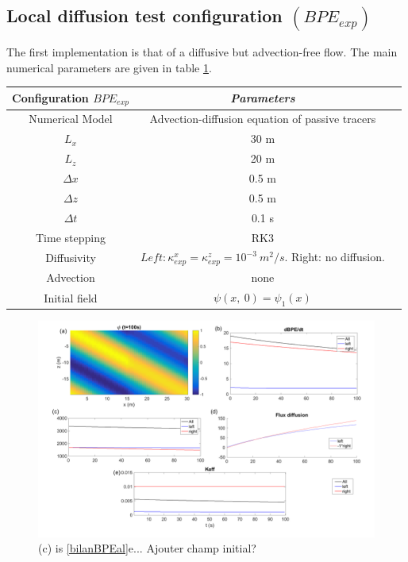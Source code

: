 \subsection{Local diffusion test configuration $(BPE_{exp})$}
The first implementation is that of a diffusive but advection-free flow. The main numerical parameters are given in table \ref{tab_NUMLAB_exp}.\\
\begin{table}[h]
        \centering
        \begin{tabular}{|c|c|c|}
                \hline
                Configuration $BPE_{exp}$ & \textit{Parameters}\\
                \hline 
                Numerical Model & Advection-diffusion equation of passive tracers\\
                $L_x$ & 30 m\\
                $L_z$ & 20 m\\
                $\Delta x$ & 0.5 m\\
                $\Delta z$ & 0.5 m\\
                $\Delta t$ & 0.1 s\\
                Time stepping & RK3 \\
                Diffusivity & $Left: \kappa_{exp}^x=\kappa_{exp}^z=10^{-3}\ m^2/s$. Right: no diffusion. \\
                Advection & none\\
                Initial field & $\psi(x,\ 0)=\psi_1(x)$\\
                \hline
        \end{tabular}
        \label{tab_NUMLAB_exp}
\end{table}
\begin{figure}[h!]
\centering
\includegraphics[width=1\textwidth]{./CHAP_BPE/AGBPE_numlab2.png}
\caption{(c) is \ref{bilanBPEal}e... Ajouter champ initial?}
\label{fig2numlab}
\end{figure}
